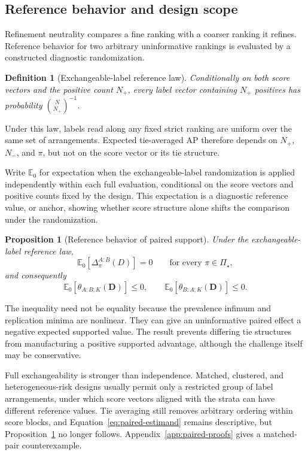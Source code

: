 \documentclass[11pt]{article}
\newcommand{\PSet}{\Pi_\star}
\newcommand{\E}{\mathbb{E}}
\newtheorem{definition}{Definition}
\newtheorem{proposition}{Proposition}
\theoremstyle{remark}
\begin{document}
\subsection{Reference behavior and design scope}
\label{sec:paired-scope}

Refinement neutrality compares a fine ranking with a coarser ranking it refines. Reference behavior for two arbitrary uninformative rankings is evaluated by a constructed diagnostic randomization.

\begin{definition}[Exchangeable-label reference law]
\label{def:exchangeable}
Conditionally on both score vectors and the positive count $N_+$, every label vector containing $N_+$ positives has probability $\binom{N}{N_+}^{-1}$.
\end{definition}

Under this law, labels read along any fixed strict ranking are uniform over the same set of arrangements. Expected tie-averaged AP therefore depends on $N_+$, $N_-$, and $\pi$, but not on the score vector or its tie structure.

Write $\E_0$ for expectation when the exchangeable-label randomization is applied independently within each full evaluation, conditional on the score vectors and positive counts fixed by the design. This expectation is a diagnostic reference value, or anchor, showing whether score structure alone shifts the comparison under the randomization.

\begin{proposition}[Reference behavior of paired support]
\label{prop:paired-reference}
Under the exchangeable-label reference law,
\[
\E_0[\Delta^{A:B}_\pi(D)]=0
\qquad\text{for every }\pi\in\PSet,
\]
and consequently
\[
\E_0[\theta_{A:B;K}(\mathbf D)]\leq0,
\qquad
\E_0[\theta_{B:A;K}(\mathbf D)]\leq0.
\]
\end{proposition}

The inequality need not be equality because the prevalence infimum and replication minima are nonlinear. They can give an uninformative paired effect a negative expected supported value. The result prevents differing tie structures from manufacturing a positive supported advantage, although the challenge itself may be conservative.

Full exchangeability is stronger than independence. Matched, clustered, and heterogeneous-risk designs usually permit only a restricted group of label arrangements, under which score vectors aligned with the strata can have different reference values. Tie averaging still removes arbitrary ordering within score blocks, and Equation~\eqref{eq:paired-estimand} remains descriptive, but Proposition~\ref{prop:paired-reference} no longer follows. Appendix~\ref{app:paired-proofs} gives a matched-pair counterexample.
\end{document}
